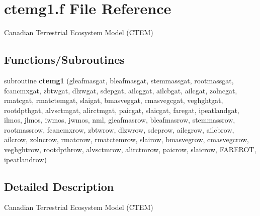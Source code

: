 \hypertarget{ctemg1_8f}{}\section{ctemg1.\+f File Reference}
\label{ctemg1_8f}


Canadian Terrestrial Ecosystem Model (C\+T\+E\+M)  


\subsection*{Functions/\+Subroutines}
\begin{DoxyCompactItemize}
\item 
\hypertarget{ctemg1_8f_ad173c7eefb7f79fe8473bb162aa2f2e3}{}subroutine {\bfseries ctemg1} (gleafmasgat, bleafmasgat, stemmassgat, rootmassgat, fcancmxgat, zbtwgat, dlzwgat, sdepgat, ailcggat, ailcbgat, ailcgat, zolncgat, rmatcgat, rmatctemgat, slaigat, bmasveggat, cmasvegcgat, veghghtgat, rootdpthgat, alvsctmgat, alirctmgat, paicgat, slaicgat, faregat, ipeatlandgat, ilmos, jlmos, iwmos, jwmos, nml, gleafmasrow, bleafmasrow, stemmassrow, rootmassrow, fcancmxrow, zbtwrow, dlzwrow, sdeprow, ailcgrow, ailcbrow, ailcrow, zolncrow, rmatcrow, rmatctemrow, slairow, bmasvegrow, cmasvegcrow, veghghtrow, rootdpthrow, alvsctmrow, alirctmrow, paicrow, slaicrow, F\+A\+R\+E\+R\+O\+T, ipeatlandrow)\label{ctemg1_8f_ad173c7eefb7f79fe8473bb162aa2f2e3}

\end{DoxyCompactItemize}


\subsection{Detailed Description}
Canadian Terrestrial Ecosystem Model (C\+T\+E\+M) 

